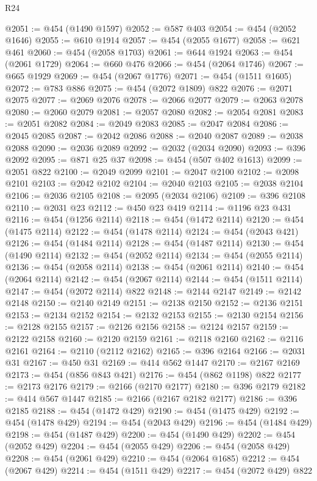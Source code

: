 \begin{lexlean}{R24}
\begin{coremodule}
@2051 := @454 (@1490 @1597)
@2052 := @587 @403
@2054 := @454 (@2052 @1646)
@2055 := @610 @1914
@2057 := @454 (@2055 @1677)
@2058 := @621 @461
@2060 := @454 (@2058 @1703)
@2061 := @644 @1924
@2063 := @454 (@2061 @1729)
@2064 := @660 @476
@2066 := @454 (@2064 @1746)
@2067 := @665 @1929
@2069 := @454 (@2067 @1776)
@2071 := @454 (@1511 @1605)
@2072 := @783 @886
@2075 := @454 (@2072 @1809) @822
@2076 := @2071 @2075
@2077 := @2069 @2076
@2078 := @2066 @2077
@2079 := @2063 @2078
@2080 := @2060 @2079
@2081 := @2057 @2080
@2082 := @2054 @2081
@2083 := @2051 @2082
@2084 := @2049 @2083
@2085 := @2047 @2084
@2086 := @2045 @2085
@2087 := @2042 @2086
@2088 := @2040 @2087
@2089 := @2038 @2088
@2090 := @2036 @2089
@2092 := @2032 (@2034 @2090)
@2093 := @396 @2092
@2095 := @871 @25 @37
@2098 := @454 (@507 @402 @1613)
@2099 := @2051 @822
@2100 := @2049 @2099
@2101 := @2047 @2100
@2102 := @2098 @2101
@2103 := @2042 @2102
@2104 := @2040 @2103
@2105 := @2038 @2104
@2106 := @2036 @2105
@2108 := @2095 (@2034 @2106)
@2109 := @396 @2108
@2110 := @2031 @23
@2112 := @450 @23 @419
@2114 := @1196 @23 @431
@2116 := @454 (@1256 @2114)
@2118 := @454 (@1472 @2114)
@2120 := @454 (@1475 @2114)
@2122 := @454 (@1478 @2114)
@2124 := @454 (@2043 @421)
@2126 := @454 (@1484 @2114)
@2128 := @454 (@1487 @2114)
@2130 := @454 (@1490 @2114)
@2132 := @454 (@2052 @2114)
@2134 := @454 (@2055 @2114)
@2136 := @454 (@2058 @2114)
@2138 := @454 (@2061 @2114)
@2140 := @454 (@2064 @2114)
@2142 := @454 (@2067 @2114)
@2144 := @454 (@1511 @2114)
@2147 := @454 (@2072 @2114) @822
@2148 := @2144 @2147
@2149 := @2142 @2148
@2150 := @2140 @2149
@2151 := @2138 @2150
@2152 := @2136 @2151
@2153 := @2134 @2152
@2154 := @2132 @2153
@2155 := @2130 @2154
@2156 := @2128 @2155
@2157 := @2126 @2156
@2158 := @2124 @2157
@2159 := @2122 @2158
@2160 := @2120 @2159
@2161 := @2118 @2160
@2162 := @2116 @2161
@2164 := @2110 (@2112 @2162)
@2165 := @396 @2164
@2166 := @2031 @31
@2167 := @450 @31
@2169 := @414 @562 @1447
@2170 := @2167 @2169
@2173 := @454 (@856 @843 @421)
@2176 := @454 (@862 @1198) @822
@2177 := @2173 @2176
@2179 := @2166 (@2170 @2177)
@2180 := @396 @2179
@2182 := @414 @567 @1447
@2185 := @2166 (@2167 @2182 @2177)
@2186 := @396 @2185
@2188 := @454 (@1472 @429)
@2190 := @454 (@1475 @429)
@2192 := @454 (@1478 @429)
@2194 := @454 (@2043 @429)
@2196 := @454 (@1484 @429)
@2198 := @454 (@1487 @429)
@2200 := @454 (@1490 @429)
@2202 := @454 (@2052 @429)
@2204 := @454 (@2055 @429)
@2206 := @454 (@2058 @429)
@2208 := @454 (@2061 @429)
@2210 := @454 (@2064 @1685)
@2212 := @454 (@2067 @429)
@2214 := @454 (@1511 @429)
@2217 := @454 (@2072 @429) @822

\end{coremodule}
\end{lexlean}
